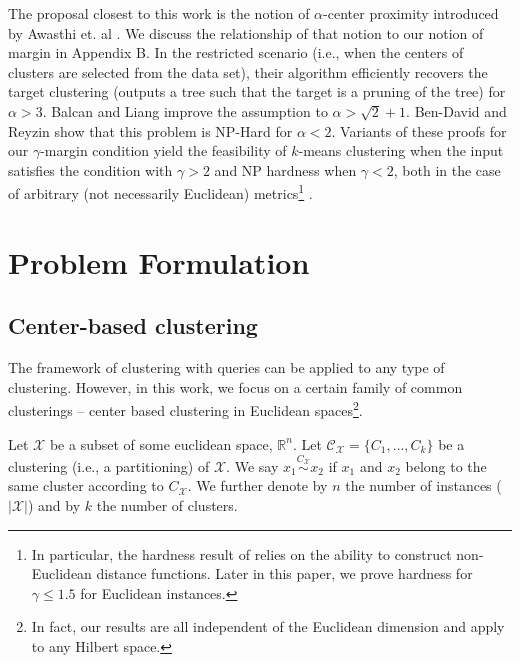 \documentclass{article}
\newcommand{\mc}{\mathcal}
\begin{document}
The proposal closest to this work is the notion of $\alpha$-center proximity introduced by Awasthi et. al \cite{awasthi2012center}. We discuss the relationship of that notion to our notion of margin in Appendix B. In the restricted scenario (i.e., when the centers of clusters are selected from the data set), their algorithm efficiently recovers the target clustering (outputs a tree such that the target is a pruning of the tree) for $\alpha > 3$.  Balcan and Liang \cite{balcan2012clustering} improve the assumption to $\alpha > \sqrt{2} + 1$. Ben-David and Reyzin \cite{ben2014data} show that this problem is NP-Hard for $\alpha < 2$. 
Variants of these proofs for our $\gamma$-margin condition
yield the feasibility of $k$-means clustering when the input satisfies the condition with $\gamma >2$ and NP hardness when $\gamma <2$, both in the case of arbitrary (not necessarily Euclidean) metrics\footnote{In particular, the hardness result of \cite{ben2014data} relies on the ability to construct non-Euclidean distance functions. Later in this paper, we prove hardness for $\gamma \leq 1.5$ for Euclidean instances.} .

\section{Problem Formulation}





\subsection{Center-based clustering}

The framework of clustering with queries can be applied to any type of clustering. However, in this work, we focus on a certain family of common clusterings -- center based clustering in Euclidean spaces\footnote{In fact, our results are all independent of the Euclidean dimension and apply to any Hilbert space.}.

Let ${\mc X}$ be a subset of some euclidean space, $\mathbb{R}^n$. Let $\mc C_{\mc X} = \{C_1, \ldots, C_k\}$ be a clustering (i.e., a partitioning) of $\mc X$. We say $x_1 \overset{C_{\mc X}}{\sim} x_2$ if $x_1$ and $x_2$ belong to the same cluster according to $C_{\mc X}$. We further denote by $n$ the number of instances ($|{\mc X}|$) and by $k$ the number of clusters.
\end{document}
